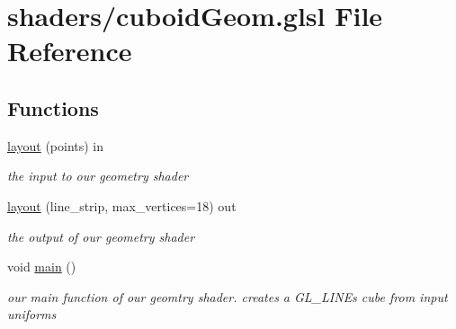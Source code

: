 \hypertarget{cuboid_geom_8glsl}{\section{shaders/cuboid\-Geom.glsl File Reference}
\label{cuboid_geom_8glsl}
}
\subsection*{Functions}
\begin{DoxyCompactItemize}
\item 
\hypertarget{cuboid_geom_8glsl_ababb901a0b8e6f569760cb90d5292d76}{\hyperlink{cuboid_geom_8glsl_ababb901a0b8e6f569760cb90d5292d76}{layout} (points) in}\label{cuboid_geom_8glsl_ababb901a0b8e6f569760cb90d5292d76}

\begin{DoxyCompactList}\small\item\em the input to our geometry shader \end{DoxyCompactList}\item 
\hypertarget{cuboid_geom_8glsl_ac1bd88519adba220230ec968a9589e71}{\hyperlink{cuboid_geom_8glsl_ac1bd88519adba220230ec968a9589e71}{layout} (line\-\_\-strip, max\-\_\-vertices=18) out}\label{cuboid_geom_8glsl_ac1bd88519adba220230ec968a9589e71}

\begin{DoxyCompactList}\small\item\em the output of our geometry shader \end{DoxyCompactList}\item 
\hypertarget{cuboid_geom_8glsl_acdef7a1fd863a6d3770c1268cb06add3}{void \hyperlink{cuboid_geom_8glsl_acdef7a1fd863a6d3770c1268cb06add3}{main} ()}\label{cuboid_geom_8glsl_acdef7a1fd863a6d3770c1268cb06add3}

\begin{DoxyCompactList}\small\item\em our main function of our geomtry shader. creates a G\-L\-\_\-\-L\-I\-N\-Es cube from input uniforms \end{DoxyCompactList}\end{DoxyCompactItemize}

